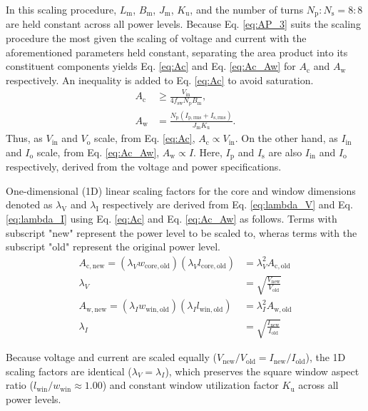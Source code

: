 In this scaling procedure, $L_{\mathrm{m}}$, $B_{\mathrm{m}}$, $J_{\mathrm{m}}$, $K_{\mathrm{u}}$, and the number of turns $N_{\mathrm{p}}:N_{\mathrm{s}} = 8:8$ are held constant across all power levels. Because Eq. \ref{eq:AP_3} suits the scaling procedure the most given the scaling of voltage and current with the aforementioned parameters held constant, separating the area product into its constituent components yields Eq. \ref{eq:Ac} and Eq. \ref{eq:Ac_Aw} for $A_\mathrm{c}$ and $A_\mathrm{w}$ respectively. An inequality is added to Eq. \ref{eq:Ac} to avoid saturation.
\begin{align}
    A_{\mathrm{c}} &\ge \frac{V_{\mathrm{in}}}{4 f_{\mathrm{sw}} N_{\mathrm{p}} B_{\mathrm{m}}}, \label{eq:Ac} \\
    A_{\mathrm{w}} &= \frac{N_{\mathrm{p}}(I_{\mathrm{p,rms}} + I_{\mathrm{s,rms}})}{J_{\mathrm{m}} K_{\mathrm{u}}}. \label{eq:Ac_Aw}
\end{align}
Thus, as $V_\mathrm{in}$ and $V_\mathrm{o}$ scale, from Eq. \ref{eq:Ac}, $A_{\mathrm{c}} \propto V_{\mathrm{in}}$. On the other hand, as $I_\mathrm{in}$ and $I_\mathrm{o}$ scale, from Eq. \ref{eq:Ac_Aw}, $A_{\mathrm{w}} \propto I$. Here, $I_\mathrm{p}$ and $I_\mathrm{s}$ are also $I_\mathrm{in}$ and $I_\mathrm{o}$ respectively, derived from the voltage and power specifications.

One-dimensional (1D) linear scaling factors for the core and window dimensions denoted as  $\lambda_\mathrm{V}$ and $\lambda_\mathrm{I}$ respectively are derived from Eq. \ref{eq:lambda_V} and Eq. \ref{eq:lambda_I} using Eq. \ref{eq:Ac} and Eq. \ref{eq:Ac_Aw} as follows. Terms with subscript "new" represent the power level to be scaled to, wheras terms with the subscript "old" represent the original power level.
\begin{align}
    A_{\mathrm{c,new}} = (\lambda_V w_{\mathrm{core,old}})(\lambda_V l_{\mathrm{core,old}}) &= \lambda_V^2 A_{\mathrm{c,old}} \\ \lambda_V &= \sqrt{\frac{V_{\mathrm{new}}}{V_{\mathrm{old}}}} \label{eq:lambda_V} \\
    A_{\mathrm{w,new}} = (\lambda_I w_{\mathrm{win,old}})(\lambda_I l_{\mathrm{win,old}}) &= \lambda_I^2 A_{\mathrm{w,old}} \\
     \lambda_I &= \sqrt{\frac{I_{\mathrm{new}}}{I_{\mathrm{old}}}} \label{eq:lambda_I}
\end{align}

Because voltage and current are scaled equally ($V_{\mathrm{new}}/V_{\mathrm{old}} = I_{\mathrm{new}}/I_{\mathrm{old}}$), the 1D scaling factors are identical ($\lambda_V = \lambda_I$), which preserves the square window aspect ratio ($l_{\mathrm{win}}/w_{\mathrm{win}} \approx 1.00$) and constant window utilization factor $K_{\mathrm{u}}$ across all power levels.

